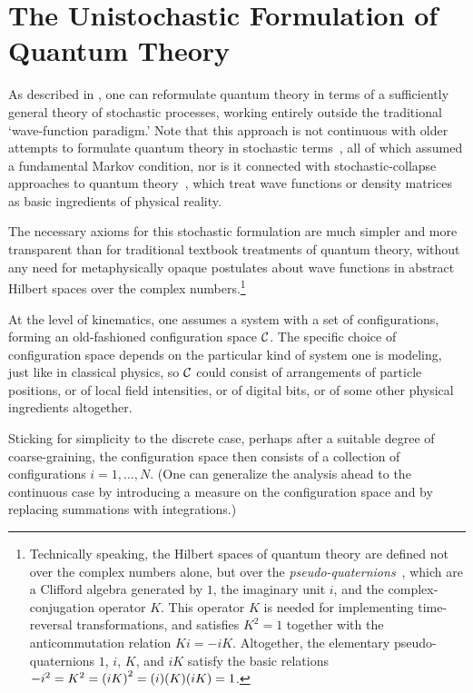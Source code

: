 \documentclass[twoside,twocolumn,english,prl,superscriptaddress,nobibnotes,nofootinbib]{revtex4-2}
\let\originalleft\left
\let\originalright\right
\renewcommand{\left}{\mathopen{}\mathclose\bgroup\originalleft}
\renewcommand{\right}{\aftergroup\egroup\originalright}
\begin{document}
\section{The Unistochastic Formulation of Quantum Theory\label{sec:The-Unistochastic-Formulation-of-Quantum-Theory}}

As described in \citep{Barandes:2023tsqc,Barandes:2023tsqt}, one
can reformulate quantum theory in terms of a sufficiently general
theory of stochastic processes, working entirely outside the traditional
\textquoteleft wave-function paradigm.\textquoteright{} Note that
this approach is not continuous with older attempts to formulate quantum
theory in stochastic terms~\citep{Bopp:1947qsuk,Bopp:1952efdqbsdk,Bopp:1953sudgdqde,Fenyes:1952ewbuidq,Nelson:1966dtobm,Nelson:1985qf},
all of which assumed a fundamental Markov condition, nor is it connected
with stochastic-collapse approaches to quantum theory~\citep{GhirardiRiminiWeber:1986udmms},
which treat wave functions or density matrices as basic ingredients
of physical reality.

The necessary axioms for this stochastic formulation are much simpler
and more transparent than for traditional textbook treatments of quantum
theory, without any need for metaphysically opaque postulates about
wave functions in abstract Hilbert spaces over the complex numbers.\footnote{Technically speaking, the Hilbert spaces of quantum theory are defined
not over the complex numbers alone, but over the \emph{pseudo-quaternions}~\citep{Stueckelberg:1960qtirhs},
which are a Clifford algebra generated by $1$, the imaginary unit
$i$, and the complex-conjugation operator $K$. This operator $K$
is needed for implementing time-reversal transformations, and satisfies
$K^{2}=1$ together with the anticommutation relation $Ki=-iK$. Altogether,
the elementary pseudo-quaternions $1$, $i$, $K$, and $iK$ satisfy
the basic relations $-i^{2}=K^{2}=\left(iK\right)^{2}=\left(i\right)\left(K\right)\left(iK\right)=1$.}

At the level of kinematics, one assumes a system with a set of configurations,
forming an old-fashioned configuration space $\mathcal{C}$. The
specific choice of configuration space depends on the particular kind
of system one is modeling, just like in classical physics, so $\mathcal{C}$
could consist of arrangements of particle positions, or of local field
intensities, or of digital bits, or of some other physical ingredients
altogether. 

Sticking for simplicity to the discrete case, perhaps after a suitable
degree of coarse-graining, the configuration space then consists of
a collection of configurations $i=1,\dots,N$. (One can generalize
the analysis ahead to the continuous case by introducing a measure
on the configuration space and by replacing summations with integrations.)
\end{document}
